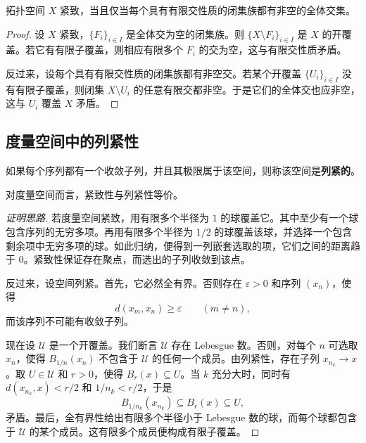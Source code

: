 \begin{theorem}[紧致性的闭集刻画]
拓扑空间 $X$ 紧致，当且仅当每个具有有限交性质的闭集族都有非空的全体交集。
\end{theorem}

\begin{proof}
设 $X$ 紧致，$\{F_i\}_{i\in I}$ 是全体交为空的闭集族。则 $\{X\setminus F_i\}_{i\in I}$ 是 $X$ 的开覆盖。若它有有限子覆盖，则相应有限多个 $F_i$ 的交为空，这与有限交性质矛盾。

反过来，设每个具有有限交性质的闭集族都有非空交。若某个开覆盖 $\{U_i\}_{i\in I}$ 没有有限子覆盖，则闭集 $X\setminus U_i$ 的任意有限交都非空。于是它们的全体交也应非空，这与 $U_i$ 覆盖 $X$ 矛盾。
\end{proof}

\subsection{度量空间中的列紧性}

\begin{definition}[列紧性]
如果每个序列都有一个收敛子列，并且其极限属于该空间，则称该空间是\textbf{列紧的}。
\end{definition}

\begin{theorem}
对度量空间而言，紧致性与列紧性等价。
\end{theorem}

\begin{proof}[证明思路]
若度量空间紧致，用有限多个半径为 $1$ 的球覆盖它。其中至少有一个球包含序列的无穷多项。再用有限多个半径为 $1/2$ 的球覆盖该球，并选择一个包含剩余项中无穷多项的球。如此归纳，便得到一列嵌套选取的项，它们之间的距离趋于 $0$。紧致性保证存在聚点，而选出的子列收敛到该点。

反过来，设空间列紧。首先，它必然全有界。否则存在 $\varepsilon>0$ 和序列 $(x_n)$，使得
\[
    d(x_m,x_n)\geq\varepsilon\qquad(m\neq n),
\]
而该序列不可能有收敛子列。

现在设 $\mathcal{U}$ 是一个开覆盖。我们断言 $\mathcal{U}$ 存在 Lebesgue 数。否则，对每个 $n$ 可选取 $x_n$，使得 $B_{1/n}(x_n)$ 不包含于 $\mathcal{U}$ 的任何一个成员。由列紧性，存在子列 $x_{n_k}\to x$。取 $U\in\mathcal{U}$ 和 $r>0$，使得 $B_r(x)\subseteq U$。当 $k$ 充分大时，同时有 $d(x_{n_k},x)<r/2$ 和 $1/n_k<r/2$，于是
\[
    B_{1/n_k}(x_{n_k})\subseteq B_r(x)\subseteq U,
\]
矛盾。最后，全有界性给出有限多个半径小于 Lebesgue 数的球，而每个球都包含于 $\mathcal{U}$ 的某个成员。这有限多个成员便构成有限子覆盖。
\end{proof}

